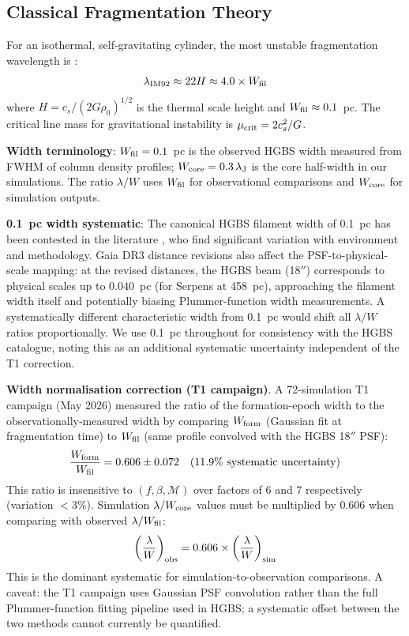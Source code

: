 \documentclass[twoside,twocolumn]{mnras}
\begin{document}
\subsection{Classical Fragmentation Theory}

For an isothermal, self-gravitating cylinder, the most unstable fragmentation wavelength
is \citep{Inutsuka1992}:
\begin{equation}
\lambda_{\rm IM92} \approx 22 H \approx 4.0 \times W_{\rm fil}
\label{eq:im92}
\end{equation}
where $H = c_s/(2G\rho_0)^{1/2}$ is the thermal scale height and $W_{\rm fil} \approx 0.1$~pc.
The critical line mass for gravitational instability is $\mu_{\rm crit} = 2c_s^2/G$.

\textbf{Width terminology}: $W_{\rm fil} = 0.1$~pc is the observed HGBS width measured
from FWHM of column density profiles; $W_{\rm core} = 0.3\,\lambda_{\rm J}$ is the
core half-width in our simulations. The ratio $\lambda/W$ uses $W_{\rm fil}$ for
observational comparisons and $W_{\rm core}$ for simulation outputs.

\textbf{0.1~pc width systematic}: The canonical HGBS filament width of 0.1~pc has been
contested in the literature \citep{Panopoulou2022}, who find significant variation with
environment and methodology. Gaia DR3 distance revisions also affect the PSF-to-physical-scale
mapping: at the revised distances, the HGBS beam (18$''$) corresponds to physical scales
up to $0.040$~pc (for Serpens at 458~pc), approaching the filament width itself and
potentially biasing Plummer-function width measurements. A systematically different
characteristic width from 0.1~pc would shift all $\lambda/W$ ratios proportionally.
We use 0.1~pc throughout for consistency with the HGBS catalogue, noting this as an
additional systematic uncertainty independent of the T1 correction.

\textbf{Width normalisation correction (T1 campaign)}.
\label{sec:width_correction}
A 72-simulation T1 campaign (May 2026) measured the ratio of the formation-epoch width
to the observationally-measured width by comparing $W_{\rm form}$ (Gaussian fit at
fragmentation time) to $W_{\rm fil}$ (same profile convolved with the HGBS 18$''$ PSF):
\begin{equation}
\frac{W_{\rm form}}{W_{\rm fil}} = 0.606 \pm 0.072 \quad (11.9\% \text{ systematic uncertainty})
\label{eq:t1_correction}
\end{equation}
This ratio is insensitive to $(f, \beta, \mathcal{M})$ over factors of 6 and 7
respectively (variation $<3\%$). Simulation $\lambda/W_{\rm core}$ values must be
multiplied by 0.606 when comparing with observed $\lambda/W_{\rm fil}$:
\begin{equation}
\left(\frac{\lambda}{W}\right)_{\rm obs} = 0.606 \times \left(\frac{\lambda}{W}\right)_{\rm sim}
\label{eq:t1_apply}
\end{equation}
This is the dominant systematic for simulation-to-observation comparisons. A caveat: the
T1 campaign uses Gaussian PSF convolution rather than the full Plummer-function fitting
pipeline used in HGBS; a systematic offset between the two methods cannot currently be
quantified.
\end{document}
